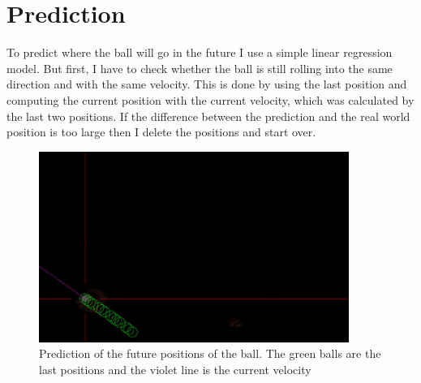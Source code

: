 \section{Prediction}\label{sec:prediction}
To predict where the ball will go in the future I use a simple linear regression\autocite{linear_regression} model.
But first, I have to check whether the ball is still rolling into the same direction and with the same velocity.
This is done by using the last position and computing the current position with the current velocity, which was calculated by the last two positions.
If the difference between the prediction and the real world position is too large then I delete the positions and start over.
\begin{figure}[H]
    \centering
    \includegraphics[width=0.9\textwidth]{../photos/ball_prediction}
    \caption[ball-prediction]{Prediction of the future positions of the ball. The green balls are the last positions and the violet line is the current velocity}
    \label{fig:ball_prediction}
\end{figure}

